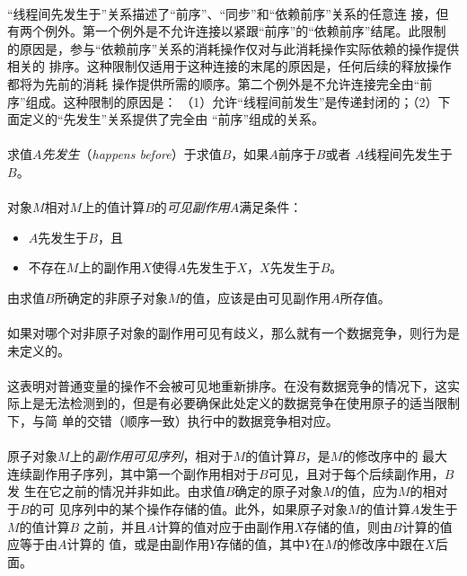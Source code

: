 \paragraph{}
\notes ``线程间先发生于''关系描述了``前序''、``同步''和``依赖前序''关系的任意连
接，但有两个例外。第一个例外是不允许连接以紧跟``前序''的``依赖前序''结尾。此限制
的原因是，参与``依赖前序''关系的消耗操作仅对与此消耗操作实际依赖的操作提供相关的
排序。这种限制仅适用于这种连接的末尾的原因是，任何后续的释放操作都将为先前的消耗
操作提供所需的顺序。第二个例外是不允许连接完全由``前序''组成。这种限制的原因是：
（1）允许``线程间前发生''是传递封闭的；（2）下面定义的``先发生''关系提供了完全由
``前序''组成的关系。

\paragraph{}
求值$A$\textit{先发生}（\textit{happens before}）于求值$B$，如果$A$前序于$B$或者
$A$线程间先发生于$B$。

\paragraph{}
对象$M$相对$M$上的值计算$B$的\textit{可见副作用}$A$满足条件：
\begin{itemize}
  \item{$A$先发生于$B$，且}
  \item{不存在$M$上的副作用$X$使得$A$先发生于$X$，$X$先发生于$B$。}
\end{itemize}
由求值$B$所确定的非原子对象$M$的值，应该是由可见副作用$A$所存值。

\paragraph{}
\notes 如果对哪个对非原子对象的副作用可见有歧义，那么就有一个数据竞争，则行为是
未定义的。

\paragraph{}
\notes 这表明对普通变量的操作不会被可见地重新排序。在没有数据竞争的情况下，这实
际上是无法检测到的，但是有必要确保此处定义的数据竞争在使用原子的适当限制下，与简
单的交错（顺序一致）执行中的数据竞争相对应。

\paragraph{}
原子对象$M$上的\textit{副作用可见序列}，相对于$M$的值计算$B$，是$M$的修改序中的
最大连续副作用子序列，其中第一个副作用相对于$B$可见，且对于每个后续副作用，$B$发
生在它之前的情况并非如此。由求值$B$确定的原子对象$M$的值，应为$M$的相对于$B$的可
见序列中的某个操作存储的值。此外，如果原子对象$M$的值计算$A$发生于$M$的值计算$B$
之前，并且$A$计算的值对应于由副作用$X$存储的值，则由$B$计算的值应等于由$A$计算的
值，或是由副作用$Y$存储的值，其中$Y$在$M$的修改序中跟在$X$后面。

